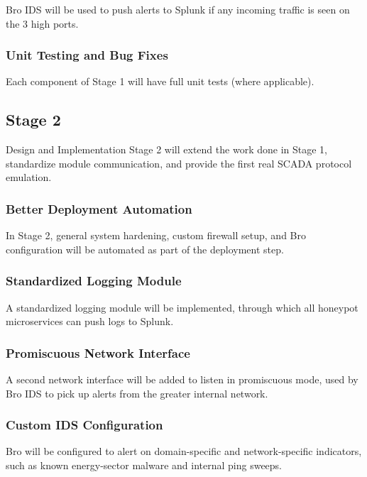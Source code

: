 Bro IDS will be used to push alerts to Splunk if any incoming traffic is seen
on the 3 high ports.

\subsubsection{Unit Testing and Bug Fixes}

Each component of Stage 1 will have full unit tests (where applicable).


\subsection{Stage 2}

Design and Implementation Stage 2 will extend the work done in Stage 1,
standardize module communication, and provide the first real SCADA protocol
emulation.

\subsubsection{Better Deployment Automation}

In Stage 2, general system hardening, custom firewall setup, and Bro
configuration will be automated as part of the deployment step.

\subsubsection{Standardized Logging Module}

A standardized logging module will be implemented, through which all honeypot
microservices can push logs to Splunk.

\subsubsection{Promiscuous Network Interface}

A second network interface will be added to listen in promiscuous mode, used
by Bro IDS to pick up alerts from the greater internal network.

\subsubsection{Custom IDS Configuration}

Bro will be configured to alert on domain-specific and network-specific
indicators, such as known energy-sector malware and internal ping sweeps.

